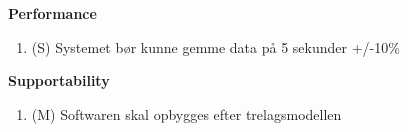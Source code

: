 \textbf{Performance}\\
\begin{enumerate}
	\item (S) Systemet bør kunne gemme data på 5 sekunder +/-10\%\\
\end{enumerate}

\textbf{Supportability}\\
\begin{enumerate}
	\item (M) Softwaren skal opbygges efter trelagsmodellen\\
\end{enumerate}




















